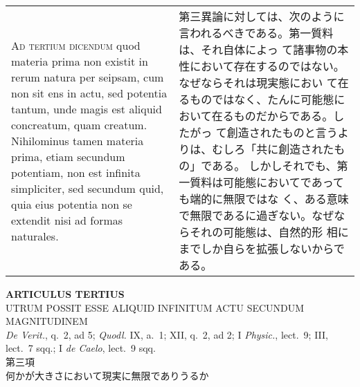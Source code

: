 \documentclass[10pt]{jsarticle} %
\begin{document}
\begin{longtable}{p{21em}p{21em}}
\\

{\scshape Ad tertium dicendum} quod materia prima non existit in rerum natura per
seipsam, cum non sit ens in actu, sed potentia tantum, unde magis est
aliquid concreatum, quam creatum. Nihilominus tamen materia prima, etiam
secundum potentiam, non est infinita simpliciter, sed secundum quid,
quia eius potentia non se extendit nisi ad formas naturales.

&

第三異論に対しては、次のように言われるべきである。第一質料は、それ自体によっ
 て諸事物の本性において存在するのではない。なぜならそれは現実態におい
 て在るものではなく、たんに可能態において在るものだからである。したがっ
 て創造されたものと言うよりは、むしろ「共に創造されたもの」である。
 しかしそれでも、第一質料は可能態においてであっても端的に無限ではな
 く、ある意味で無限であるに過ぎない。なぜならそれの可能態は、自然的形
 相にまでしか自らを拡張しないからである。




\end{longtable}
\newpage
{}

\begin{center}
 {\Large {\bf ARTICULUS TERTIUS}}\\
 {\large UTRUM POSSIT ESSE ALIQUID INFINITUM ACTU SECUNDUM MAGNITUDINEM}\\
 {\footnotesize {\itshape De Verit.}, q.~2, ad 5; {\itshape Quodl.} IX,
 a.~1; XII, q.~2, ad 2; I {\itshape Physic.}, lect.~9; III, lect.~7
 sqq.; I {\itshape de Caelo}, lect.~9 sqq.}\\
 {\Large 第三項\\何かが大きさにおいて現実に無限でありうるか}
\end{center}
\end{document}
